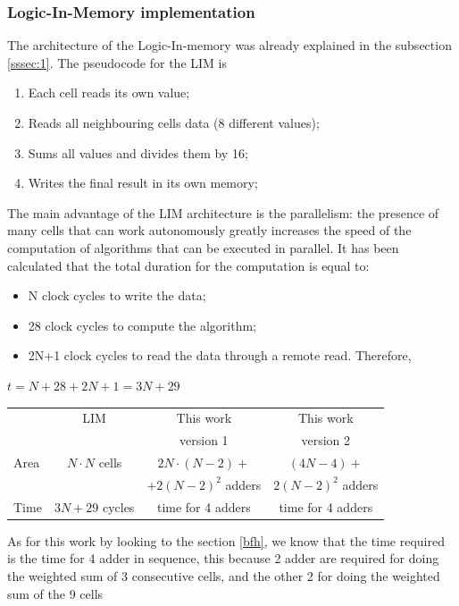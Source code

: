	  \subsubsection{Logic-In-Memory implementation}
	  The architecture of the Logic-In-memory was already explained in the subsection \ref{sssec:1}.
	  The pseudocode for the LIM is
	  \begin{enumerate}
	  	\item Each cell reads its own value;
	  	\item Reads all neighbouring cells data (8 different values); 
	  	\item Sums all values and divides them by 16;
	  	\item Writes the final result in its own memory;
	  \end{enumerate}
	 The main advantage of the LIM architecture is the parallelism: the presence of many cells that can work autonomously greatly increases the speed of the computation of algorithms that can be executed in parallel.
	 It has been calculated that the total duration for the computation is equal to: 
	 \begin{itemize}
	 	\item N clock cycles to write the data;
	 	\item 28 clock cycles to compute the algorithm;
	 	\item 2N+1 clock cycles to read the data through a remote read. Therefore,
	 \end{itemize}   \begin{center}
	 	 $ t = N + 28 + 2N +1=3N + 29 $
	\end{center}
	
	 \begin{center}
	 	\begin{tabular}{ | p{1.7cm} | c | c | c |}
	 			
	 		\hline
	 	 & LIM & This work & This work\\
	 	\label{table:bf_tab}	& & version 1& version 2\\
	 			 		\hline
	 		Area & $ N\cdotp N $ cells  &  $ 2N\cdotp (N-2)+$& $(4N-4)+$ \\
	 		& & $+2(N-2)^2$ adders & $2(N-2)^2$ adders \\
	 		\hline
	 		Time & $ 3N + 29 $ cycles
	 		&
	 		 time for 4 adders  &
	 		 time for 4 adders  \\
	 		\hline
	 		
	 	\end{tabular}
	 \end{center}
	As for this work by looking to the section \ref{bfh}, we know that the time required is the time for 4 adder in sequence, this because 2 adder are required for doing the weighted sum of 3 consecutive cells, and the other 2 for doing the weighted sum of the 9 cells

